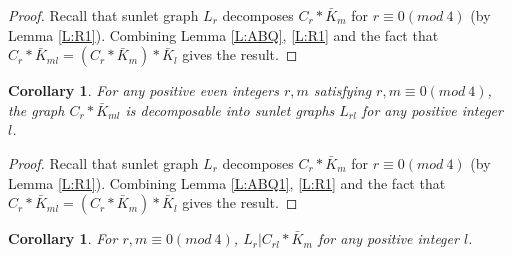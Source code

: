 \documentclass[12pt]{report}
\newtheorem{cor}[thm]{Corollary}
\begin{document}
\begin{proof}
Recall that sunlet graph $L_r$ decomposes  $C_r*\bar{K}_m$ for
$r\equiv 0(mod\ 4)$ (by Lemma \ref{L:R1}). Combining Lemma
\ref{L:ABQ}, \ref{L:R1} and the fact that
$C_r*\bar{K}_{ml}=(C_r*\bar{K}_m)*\bar{K}_l$ gives the result.
\end{proof}
\begin{cor}\label{C:R1}
For any positive even integers $r,m$ satisfying $r,m\equiv 0(mod\
4)$,
the graph $C_r*\bar{K}_{ml}$ is decomposable into sunlet graphs
$L_{rl}$ for any positive integer $l$.
\end{cor}
\begin{proof}
Recall that sunlet graph $L_r$ decomposes  $C_r*\bar{K}_m$ for
$r\equiv 0(mod\ 4)$ (by Lemma \ref{L:R1}). Combining Lemma
\ref{L:ABQ1}, \ref{L:R1} and the fact that
$C_r*\bar{K}_{ml}=(C_r*\bar{K}_m)*\bar{K}_l$ gives the result.

\end{proof}
\begin{cor}\label{C:R2}
For $r,m\equiv 0(mod\ 4)$, $L_r|C_{rl}*\bar{K}_m$ for any positive
integer $l$.
\end{cor}
\end{document}
